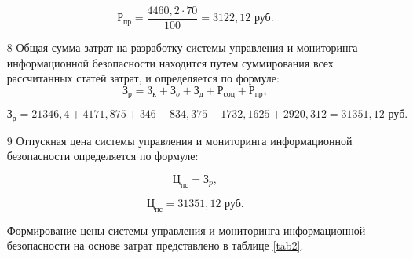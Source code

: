\begin{itemize}
$$
 \text{Р}_{\text{пр}} = \frac{4460,2 \cdot 70}{100} =  3122,12 \text{ руб}.
$$

\item[8]Общая сумма затрат на разработку системы управления и мониторинга информационной безопасности находится путем суммирования всех рассчитанных статей затрат, и определяется по формуле:
$$
    \text{З}_{\text{р}} = \text{3}_{\text{к}} +  \text{З}_{o} + \text{З}_{\text{д}} + \text{Р}_{\text{соц}} + \text{Р}_{\text{пр}},
$$

$$
 \text{З}_{\text{р}} =21346,4 + 4171,875 +346 + 834,375 + 1732,1625 + 2920,312 =  31351,12 \text{ руб}.
$$
\item[9]Отпускная цена системы управления и мониторинга информационной безопасности определяется по формуле:

$$
    \text{Ц}_{\text{пс}} = \text{З}_{p},
$$

$$
\text{Ц}_{\text{пс}} =  31351,12 \text{ руб}.
$$


Формирование цены системы управления и мониторинга информационной безопасности на основе затрат представлено в таблице \ref{tab2}.


\end{itemize}
